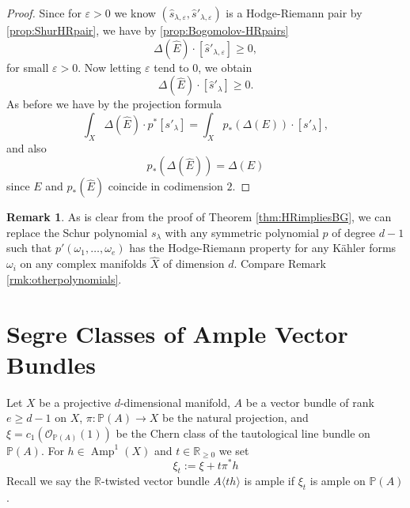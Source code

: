 \documentclass[a4,reqno]{amsart}
\theoremstyle{definition}
\newtheorem{remark}[theorem]{Remark}
\def\cO{\mathcal O}
\renewcommand{\P}{\mathbb{P}}
\DeclareMathOperator{\Amp}{Amp}
\numberwithin{equation}{section}
\begin{document}
\begin{proof}
Since for $\varepsilon>0$ we know $(\hat{s}_{\lambda,\varepsilon}, \hat{s}'_{\lambda,\varepsilon})$ is a Hodge-Riemann pair by \cref{prop:ShurHRpair}, we have by \cref{prop:Bogomolov-HRpairs}
\[
    \Delta(\hat{E}) \cdot [\hat{s}'_{\lambda,\varepsilon}] \ge 0,
\]
for small $\varepsilon > 0$. Now letting $\varepsilon$ tend to $0$, we obtain
\[
    \Delta(\hat{E}) \cdot [\hat{s}'_\lambda] \ge 0.
\]
As before we have by the projection formula
\[
    \int_{\hat{X}} \Delta(\hat{E})\cdot p^*[s'_\lambda] = \int_X p_*(\Delta(E))\cdot [s'_\lambda],
\]
and also
\[
    p_*(\Delta(\hat{E})) = \Delta(E)
\]
since $E$ and $p_*(\hat{E})$ coincide in codimension $2$.

\end{proof}

\begin{remark}
As is clear from the proof of Theorem \ref{thm:HRimpliesBG},  we can replace the Schur polynomial $s_{\lambda}$ with any symmetric polynomial $p$ of degree $d-1$ such that $p'(\omega_1,\ldots,\omega_{e})$ has the Hodge-Riemann property for any K\"ahler forms $\omega_i$ on any complex manifolds $\hat{X}$ of dimension $d$.  Compare Remark \ref{rmk:otherpolynomials}.
\end{remark}

\section{Segre Classes of Ample Vector Bundles}\label{sec:SegreClasses}

Let $X$ be a  projective $d$-dimensional manifold, $A$ be a vector bundle of rank $e \ge d-1$ on $X$, $\pi : \P(A) \to X$ be the natural projection, and $\xi = c_1(\cO_{\P(A)}(1))$ be the Chern class of the tautological line bundle on $\P(A)$. For $h\in \Amp^1(X)$ and $t\in \mathbb R_{\ge 0}$ we set
$$\xi_t := \xi + t \pi^* h$$
Recall we say the $\mathbb R$-twisted vector bundle $A\langle th\rangle$ is ample if $\xi_t$ is ample on $\mathbb P(A)$.
\end{document}
